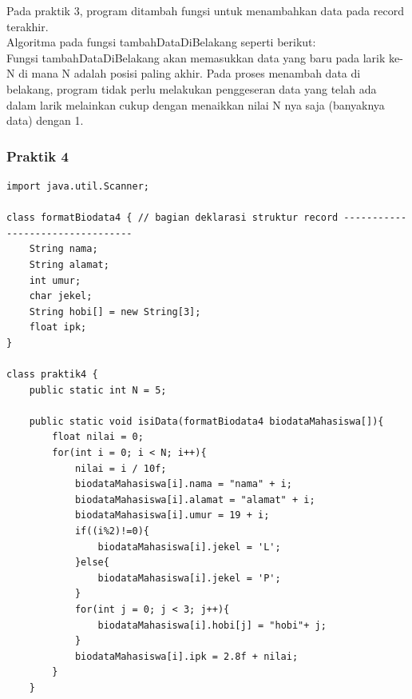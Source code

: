 \documentclass[a4paper,12pt]{article}
\begin{document}
Pada praktik 3, program ditambah fungsi untuk menambahkan data pada record terakhir.\\
Algoritma pada fungsi tambahDataDiBelakang seperti berikut:\\
Fungsi tambahDataDiBelakang akan memasukkan data yang baru pada larik ke-N di mana N adalah posisi paling
akhir. Pada proses menambah data di belakang, program tidak perlu melakukan penggeseran data yang telah ada dalam larik
melainkan cukup dengan menaikkan nilai N nya saja (banyaknya data) dengan 1.

\subsubsection{Praktik 4}
\begin{lstlisting}
import java.util.Scanner;

class formatBiodata4 { // bagian deklarasi struktur record ---------------------------------
    String nama;
    String alamat;
    int umur;
    char jekel;
    String hobi[] = new String[3];
    float ipk;
}

class praktik4 {
    public static int N = 5;

    public static void isiData(formatBiodata4 biodataMahasiswa[]){
        float nilai = 0;
        for(int i = 0; i < N; i++){
            nilai = i / 10f;
            biodataMahasiswa[i].nama = "nama" + i;
            biodataMahasiswa[i].alamat = "alamat" + i;
            biodataMahasiswa[i].umur = 19 + i;
            if((i%2)!=0){
                biodataMahasiswa[i].jekel = 'L';
            }else{
                biodataMahasiswa[i].jekel = 'P';
            }
            for(int j = 0; j < 3; j++){
                biodataMahasiswa[i].hobi[j] = "hobi"+ j;
            }
            biodataMahasiswa[i].ipk = 2.8f + nilai;
        }
    }


\end{lstlisting}
\end{document}

